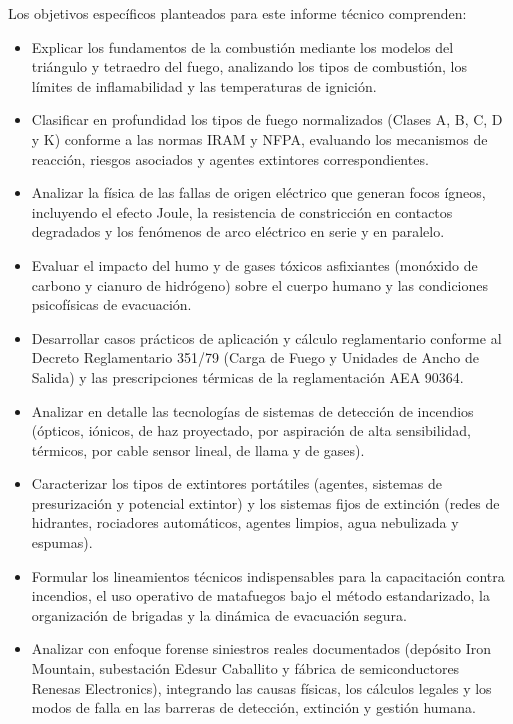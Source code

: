Los objetivos específicos planteados para este informe técnico comprenden:
\begin{itemize}
    \item Explicar los fundamentos de la combustión mediante los modelos del triángulo y tetraedro del fuego,
          analizando los tipos de combustión, los límites de inflamabilidad y las temperaturas de ignición.
    \item Clasificar en profundidad los tipos de fuego normalizados (Clases A, B, C, D y K) conforme a las normas IRAM
          y NFPA, evaluando los mecanismos de reacción, riesgos asociados y agentes extintores correspondientes.
    \item Analizar la física de las fallas de origen eléctrico que generan focos ígneos, incluyendo el efecto Joule, la
          resistencia de constricción en contactos degradados y los fenómenos de arco eléctrico en serie y en paralelo.
    \item Evaluar el impacto del humo y de gases tóxicos asfixiantes (monóxido de carbono y cianuro de hidrógeno) sobre
          el cuerpo humano y las condiciones psicofísicas de evacuación.
    \item Desarrollar casos prácticos de aplicación y cálculo reglamentario conforme al Decreto Reglamentario 351/79 (Carga
          de Fuego y Unidades de Ancho de Salida) y las prescripciones térmicas de la reglamentación AEA 90364.
    \item Analizar en detalle las tecnologías de sistemas de detección de incendios (ópticos, iónicos, de haz
          proyectado, por aspiración de alta sensibilidad, térmicos, por cable sensor lineal, de llama y de gases).
    \item Caracterizar los tipos de extintores portátiles (agentes, sistemas de presurización y potencial extintor) y los
          sistemas fijos de extinción (redes de hidrantes, rociadores automáticos, agentes limpios, agua nebulizada y
          espumas).
    \item Formular los lineamientos técnicos indispensables para la capacitación contra incendios, el uso operativo de
          matafuegos bajo el método estandarizado, la organización de brigadas y la dinámica de evacuación segura.
    \item Analizar con enfoque forense siniestros reales documentados (depósito Iron Mountain, subestación Edesur
          Caballito y fábrica de semiconductores Renesas Electronics), integrando las causas físicas, los cálculos
          legales y los modos de falla en las barreras de detección, extinción y gestión humana.

\end{itemize}
